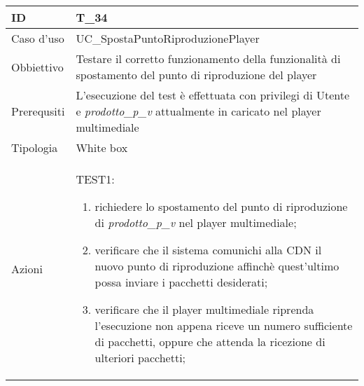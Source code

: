 \begin{table}[hb]
    \centering
    \begin{tabular}{ |p{2cm}|p{10cm}|  }
        \hline
        ID          & T\_34                                                                                                                               \\\hline
        Caso d'uso  & UC\_SpostaPuntoRiproduzionePlayer                                                                                                   \\\hline
        Obbiettivo  & Testare il corretto funzionamento della funzionalità di spostamento del punto di riproduzione del player                            \\\hline
        Prerequsiti & L'esecuzione del test è effettuata con privilegi di Utente e \emph{prodotto\_p\_v} attualmente in caricato nel player multimediale \\\hline
        Tipologia   & White box                                                                                                                           \\\hline
        Azioni      &
        TEST1:
        \begin{enumerate}[nosep, topsep=0pt]
            \item richiedere lo spostamento del punto di riproduzione di \emph{prodotto\_p\_v} nel player multimediale;
            \item verificare che il sistema comunichi alla CDN il nuovo punto di riproduzione affinchè quest'ultimo possa inviare i pacchetti desiderati;
            \item verificare che il player multimediale riprenda l'esecuzione non appena riceve un numero sufficiente di pacchetti, oppure che attenda la ricezione di ulteriori pacchetti;
        \end{enumerate}
        \\\hline
    \end{tabular}
\end{table}

